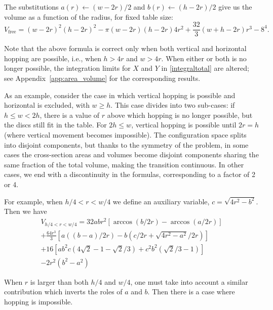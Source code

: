 \documentclass[superscriptaddress,pre,reprint,showpacs,twocolumn]{revtex4-1}
\begin{document}
The substitutions $a(r)\leftarrow (w-2r)/2$ and $b(r)\leftarrow (h-2r)/2$ give us
 the volume as a function of the radius, for fixed table size:
\begin{equation}\label{volumewhd}
 V_\text{free} 
= (w-2r)^{2} (h-2r)^{2}  - 
 \pi (w-2r)(h-2r) 4 r^{2} + 
\textstyle \frac{32}{3} (w+h-2r) r^{3}  
- 8^{4}.
\end{equation}

Note that the above formula is correct only when both
vertical and horizontal hopping are possible, i.e., when $h > 4r$ and $w > 4r$.
When either or both is no longer possible, the 
integration limits for $X$ and $Y$ in \eqref{integraltotal} are altered; 
see Appendix~\ref{app:area_volume} for the corresponding results.

As an example, consider the case in which vertical hopping is possible
and horizontal is excluded, with $w \geq h$.
This case divides into two sub-cases: if
$ h \leq  w < 2 h $, there is a value of $r$ above which hopping is no longer possible,
but the discs still fit in the table. For $2 h \leq w $, vertical hopping is
possible until $ 2 r= h$ (where vertical movement becomes impossible). 
The configuration space splits into disjoint components, but 
thanks to the symmetry of
the problem, in some cases the cross-section areas and 
volumes become disjoint components sharing the same fraction of
the total volume, making the transition continuous. In other cases, we end with 
a discontinuity in the formulas,
corresponding to a factor of 2 or 4. 


For example, when $h/4 < r < w/4$ 
we define an auxiliary variable,
$c = \sqrt{4r^2-b^2}$. Then we have
\begin{multline}\label{VolumenCasoFeo}
V_{h/4<r<w/4} = 32abr^2 \left[ \arccos(b/2r)-\arccos(a/2r) \right]\\
+\frac{64 r^3}{3 } \left[ a((b-a)/2r)-b(c/2r+\sqrt{4r^2-a^2}/2r) \right]\\
+16 \left[ a b^2 c (4\sqrt{2}-1-\sqrt{2}/3) 
  +c^2b^2 (\sqrt{2}/3-1) \right]\\
-2r^2 (b^2-a^2)
\end{multline}

When $r$ is larger than both $h/4$ and $w/4$, one must take
into account a similar
contribution which inverts the roles of $a$ and $b$. Then there is
a case where hopping is impossible. 

\end{document}
